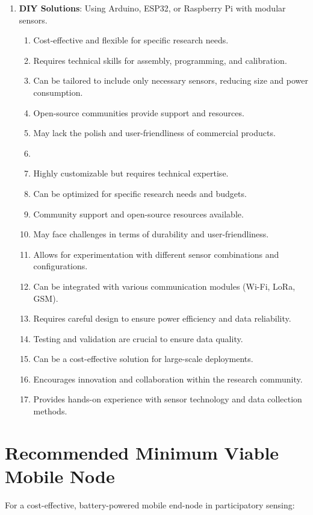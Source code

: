 \documentclass[12pt,a4paper]{article}
\begin{document}
\begin{enumerate}
\item \textbf{DIY Solutions}: Using Arduino, ESP32, or Raspberry Pi with modular sensors.
\begin{enumerate}
    \item Cost-effective and flexible for specific research needs.
    \item Requires technical skills for assembly, programming, and calibration.
    \item Can be tailored to include only necessary sensors, reducing size and power consumption.
    \item Open-source communities provide support and resources.
    \item May lack the polish and user-friendliness of commercial products.
    \item
    \item Highly customizable but requires technical expertise.
    \item Can be optimized for specific research needs and budgets.
    \item Community support and open-source resources available.
    \item May face challenges in terms of durability and user-friendliness.
    \item Allows for experimentation with different sensor combinations and configurations.
    \item Can be integrated with various communication modules (Wi-Fi, LoRa, GSM).
    \item Requires careful design to ensure power efficiency and data reliability.
    \item Testing and validation are crucial to ensure data quality.
    \item Can be a cost-effective solution for large-scale deployments.
    \item Encourages innovation and collaboration within the research community.
    \item Provides hands-on experience with sensor technology and data collection methods.
\end{enumerate}

\end{enumerate}

\section*{Recommended Minimum Viable Mobile Node}

For a cost-effective, battery-powered mobile end-node in participatory sensing:
\end{document}
